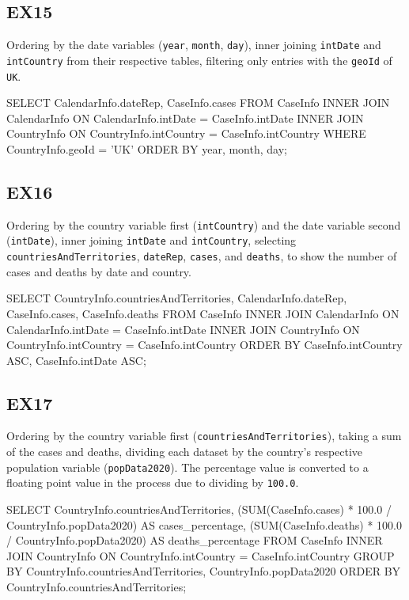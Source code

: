 \documentclass[]{article}
\begin{document}
\subsection{EX15}
Ordering by the date variables (\verb|year|, \verb|month|, \verb|day|), inner joining \verb|intDate| and \verb|intCountry| from their respective tables, filtering only entries with the \verb|geoId| of \verb|UK|.

\begin{ffcode}
SELECT
    CalendarInfo.dateRep,
    CaseInfo.cases
FROM CaseInfo
INNER JOIN CalendarInfo ON CalendarInfo.intDate = CaseInfo.intDate
INNER JOIN CountryInfo ON CountryInfo.intCountry = CaseInfo.intCountry
WHERE CountryInfo.geoId = 'UK'
ORDER BY year, month, day;
\end{ffcode}
\subsection{EX16}
Ordering by the country variable first (\verb|intCountry|) and the date variable second (\verb|intDate|), inner joining \verb|intDate| and \verb|intCountry|, selecting \verb|countriesAndTerritories|, \verb|dateRep|, \verb|cases|, and \verb|deaths|, to show the number of cases and deaths by date and country.
\begin{ffcode}
SELECT
    CountryInfo.countriesAndTerritories,
    CalendarInfo.dateRep,
    CaseInfo.cases,
    CaseInfo.deaths
FROM CaseInfo
INNER JOIN CalendarInfo ON CalendarInfo.intDate = CaseInfo.intDate
INNER JOIN CountryInfo ON CountryInfo.intCountry = CaseInfo.intCountry
ORDER BY CaseInfo.intCountry ASC, CaseInfo.intDate ASC;
\end{ffcode}
\subsection{EX17}
Ordering by the country variable first (\verb|countriesAndTerritories|), taking a sum of the cases and deaths, dividing each dataset by the country's respective population variable (\verb|popData2020|). The percentage value is converted to a floating point value in the process due to dividing by \verb|100.0|.
\begin{ffcode}
SELECT
    CountryInfo.countriesAndTerritories,
    (SUM(CaseInfo.cases) * 100.0 / CountryInfo.popData2020) AS cases_percentage,
    (SUM(CaseInfo.deaths) * 100.0 / CountryInfo.popData2020) AS deaths_percentage
FROM CaseInfo
INNER JOIN CountryInfo ON CountryInfo.intCountry = CaseInfo.intCountry
GROUP BY CountryInfo.countriesAndTerritories, CountryInfo.popData2020
ORDER BY CountryInfo.countriesAndTerritories;
\end{ffcode}
\end{document}
